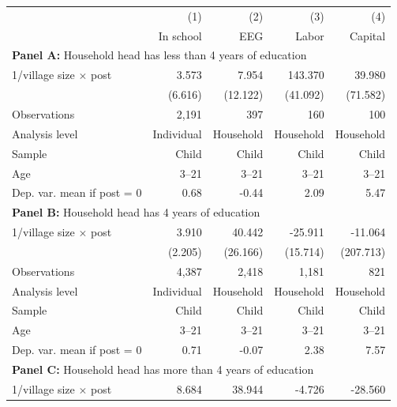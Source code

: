 \begin{center} \begin{threeparttable} \begin{tabular}{l*{4}{r}} \hline \hline 
                    &         (1)&         (2)&         (3)&         (4)\\
                    &   In school&         EEG&       Labor&     Capital\\
\hline \multicolumn{5}{l}{\textbf{Panel A:} Household head has less than 4 years of education} \\
1/village size $\times$ post&       3.573&       7.954&     143.370&      39.980\\
                    &     (6.616)&    (12.122)&    (41.092)&    (71.582)\\
\hline
Observations        &       2,191&         397&         160&         100\\
Analysis level      &  Individual&   Household&   Household&   Household\\
Sample              &       Child&       Child&       Child&       Child\\
Age                 &       3--21&       3--21&       3--21&       3--21\\
Dep. var. mean if post = 0&        0.68&       -0.44&        2.09&        5.47\\
\hline \multicolumn{5}{l}{\textbf{Panel B:} Household head has 4 years of education} \\
1/village size $\times$ post&       3.910&      40.442&     -25.911&     -11.064\\
                    &     (2.205)&    (26.166)&    (15.714)&   (207.713)\\
\hline
Observations        &       4,387&       2,418&       1,181&         821\\
Analysis level      &  Individual&   Household&   Household&   Household\\
Sample              &       Child&       Child&       Child&       Child\\
Age                 &       3--21&       3--21&       3--21&       3--21\\
Dep. var. mean if post = 0&        0.71&       -0.07&        2.38&        7.57\\
\hline \multicolumn{5}{l}{\textbf{Panel C:} Household head has more than 4 years of education} \\
1/village size $\times$ post&       8.684&      38.944&      -4.726&     -28.560\\

\end{tabular}
\end{threeparttable}
\end{center}
